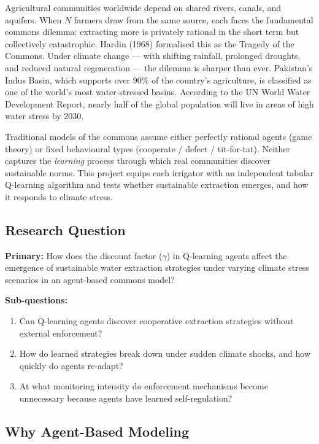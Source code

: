 \documentclass[12pt, a4paper]{article}
\begin{document}
Agricultural communities worldwide depend on shared rivers, canals, and aquifers.
When $N$ farmers draw from the same source, each faces the fundamental commons
dilemma: extracting more is privately rational in the short term but collectively
catastrophic. Hardin (1968) formalised this as the Tragedy of the Commons. Under
climate change --- with shifting rainfall, prolonged droughts, and reduced natural
regeneration --- the dilemma is sharper than ever. Pakistan's Indus Basin, which
supports over $90\%$ of the country's agriculture, is classified as one of the
world's most water-stressed basins. According to the UN World Water Development
Report, nearly half of the global population will live in areas of high water
stress by 2030.

Traditional models of the commons assume either perfectly rational agents (game
theory) or fixed behavioural types (cooperate / defect / tit-for-tat). Neither
captures the \emph{learning} process through which real communities discover
sustainable norms. This project equips each irrigator with an independent
tabular Q-learning algorithm and tests whether sustainable extraction emerges,
and how it responds to climate stress.

\subsection{Research Question}

\begin{tcolorbox}[colback=white, colframe=nutDark, arc=2mm, boxrule=1pt]
\textbf{Primary:} How does the discount factor ($\gamma$) in Q-learning agents
affect the emergence of sustainable water extraction strategies under varying
climate stress scenarios in an agent-based commons model?
\end{tcolorbox}

\noindent\textbf{Sub-questions:}
\begin{enumerate}[label=(\arabic*)]
    \item Can Q-learning agents discover cooperative extraction strategies without external enforcement?
    \item How do learned strategies break down under sudden climate shocks, and how quickly do agents re-adapt?
    \item At what monitoring intensity do enforcement mechanisms become unnecessary because agents have learned self-regulation?
\end{enumerate}

\subsection{Why Agent-Based Modeling}
\end{document}
